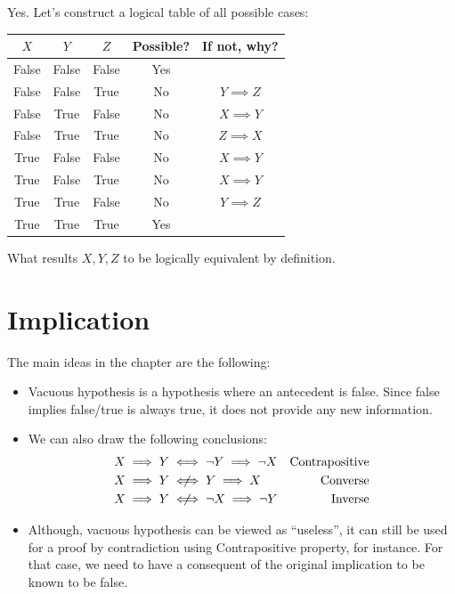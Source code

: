 \begin{solution}
    Yes. Let's construct a logical table of all possible cases:
    \begin{center}
        \begin{tabular}{ccccc}
            $X$ & $Y$ & $Z$ & Possible? & If not, why?\\
            \hline
            False & False & False & Yes\\
            False & False & True & No & $Y \implies Z$\\
            False & True & False & No & $X \implies Y$\\
            False & True & True & No & $Z \implies X$\\
            True & False & False & No & $X \implies Y$\\
            True & False & True & No & $X \implies Y$\\
            True & True & False & No & $Y \implies Z$\\
            True & True & True & Yes\\
        \end{tabular}
    \end{center}
    What results $X, Y, Z$ to be logically equivalent by definition.
\end{solution}

\section{Implication}

The main ideas in the chapter are the following:
\begin{itemize}
    \item Vacuous hypothesis is a hypothesis where an antecedent is false. Since false implies false/true is always true, it does not provide any new information. 
    \item We can also draw the following conclusions:
    \begin{align*}
        X \implies Y & \iff \neg Y \implies \neg X & \text{Contrapositive}\\
        X \implies Y & \notiff Y \implies X & \text{Converse}\\
        X \implies Y & \notiff \neg X \implies \neg Y & \text{Inverse}
    \end{align*}
    \item Although, vacuous hypothesis can be viewed as ``useless'', it can still be used for a proof by contradiction using Contrapositive property, for instance. For that case, we need to have a consequent of the original implication to be known to be false. 
\end{itemize}
